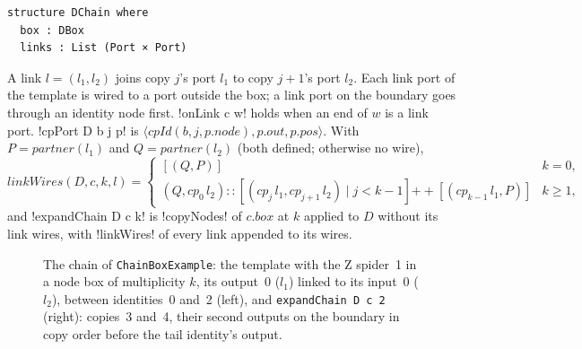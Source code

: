 {\begin{definition}\label{def:boxes-DChain}
\begin{lstlisting}[style=leanbox]
structure DChain where
  box : DBox
  links : List (Port × Port)
\end{lstlisting}
A link $l=(l_1,l_2)$ joins copy $j$'s port $l_1$ to copy $j+1$'s port $l_2$. Each link port of the template is wired to a port outside the box; a link port on the boundary goes through an identity node first. \lbx!onLink c w! holds when an end of $w$ is a link port. \lbx!cpPort D b j p! is $\langle\mathit{cpId}(b,j,p.\mathit{node}),p.\mathit{out},p.\mathit{pos}\rangle$. With $P=\mathit{partner}(l_1)$ and $Q=\mathit{partner}(l_2)$ (both defined; otherwise no wire),
\[
\mathit{linkWires}(D,c,k,l)=\begin{cases}[(Q,P)] & k=0,\\ (Q,\mathit{cp}_0\,l_2)::[(\mathit{cp}_j\,l_1,\mathit{cp}_{j+1}\,l_2)\mid j<k-1]\mathbin{+\!\!+}[(\mathit{cp}_{k-1}\,l_1,P)] & k\ge1,\end{cases}
\]
and \lbx!expandChain D c k! is \lbx!copyNodes! of $c.\mathit{box}$ at $k$ applied to $D$ without its link wires, with \lbx!linkWires! of every link appended to its wires.
\end{definition}

\begin{figure}[ht]
\centering
{}
\qquad\qquad
{}
\caption{The chain of \texttt{ChainBoxExample}: the template with the Z spider~1 in a node box of multiplicity $k$, its output~0 ($l_1$) linked to its input~0 ($l_2$), between identities~0 and~2 (left), and \texttt{expandChain D c 2} (right): copies~3 and~4, their second outputs on the boundary in copy order before the tail identity's output.}\label{fig:boxes-chain-example}
\end{figure}

}

